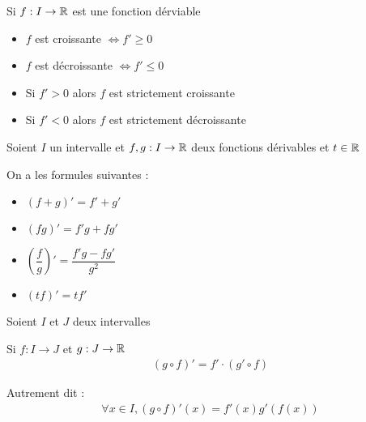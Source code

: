 \begin{graybox}
	\begin{proposition}
		Si $f:I \to \mathbb{R}$ est une fonction dérviable
		\begin{itemize}
			\item $f$ est croissante $\iff f' \geq 0$
			\item $f$ est décroissante $\iff f' \leq 0$
			\item Si $f' > 0$ alors $f$ est strictement croissante
			\item Si $f' < 0$ alors $f$ est strictement décroissante
		\end{itemize}
	\end{proposition}
\end{graybox}

\begin{graybox}
	\begin{proposition}
		\par Soient $I$ un intervalle et $f,g:I \to \mathbb{R}$ deux fonctions dérivables et $t \in \mathbb{R}$
		\par On a les formules suivantes :
		\begin{itemize}
			\item $(f + g)' = f' + g'$
			\item $(fg)' = f'g + fg'$
			\item $\left(\dfrac{f}{g}\right)' = \dfrac{f'g - fg'}{g^2}$
			\item $(tf)' = tf'$
		\end{itemize}
	\end{proposition}
\end{graybox}

\begin{graybox}
	\begin{proposition}
		\par Soient $I$ et $J$ deux intervalles
		\par Si $f:I \to J$ et $g:J \to \mathbb{R}$
		\begin{align*}
			(g \circ f)' = f' \cdot (g' \circ f)
		\end{align*}
		\par Autrement dit :
		\begin{align*}
			\forall x \in I, (g \circ f)'(x) = f'(x) g'(f(x))
		\end{align*}
	\end{proposition}
\end{graybox}

